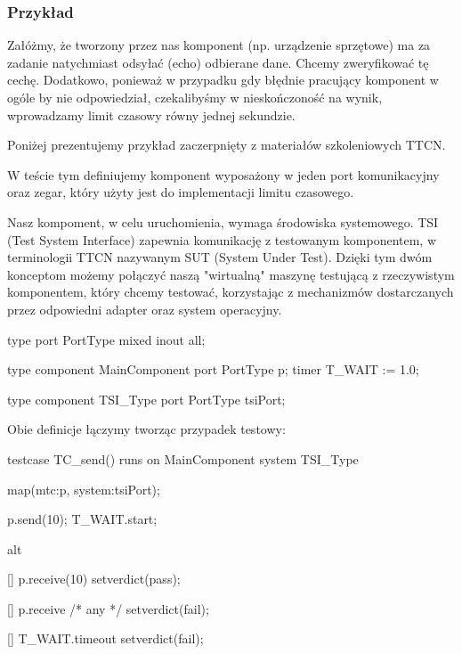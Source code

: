 \documentclass[00-praca-magisterska.tex]{subfiles}
\begin{document}
\subsubsection{Przykład}

Załóżmy, że tworzony przez nas komponent (np. urządzenie sprzętowe) ma za
zadanie natychmiast odsyłać (echo) odbierane dane. Chcemy zweryfikować tę
cechę. Dodatkowo, ponieważ w przypadku gdy błędnie pracujący komponent w ogóle
by nie odpowiedział, czekalibyśmy w nieskończoność na wynik, wprowadzamy limit
czasowy równy jednej sekundzie.

Poniżej prezentujemy przykład zaczerpnięty z materiałów szkoleniowych
TTCN. 

W teście tym definiujemy komponent  wyposażony w jeden port
komunikacyjny oraz zegar, który użyty jest do implementacji limitu czasowego.

Nasz kompoment, w celu uruchomienia, wymaga środowiska systemowego. TSI (Test
System Interface) zapewnia komunikację z testowanym komponentem, w terminologii
TTCN nazywanym SUT (System Under Test). Dzięki tym dwóm konceptom możemy
połączyć naszą "wirtualną" maszynę testującą z rzeczywistym komponentem, który
chcemy testować, korzystając z mechanizmów dostarczanych przez odpowiedni
adapter oraz system operacyjny.

\begin{textcode}
  type port PortType mixed { inout all; }
  
  type component MainComponent
  {
      port PortType p;
      timer T_WAIT := 1.0;
  }
  
  type component TSI_Type
  {
      port PortType tsiPort;
  }
\end{textcode}

Obie definicje łączymy tworząc przypadek testowy:

\begin{textcode}
  testcase TC_send() runs on MainComponent system TSI_Type
  {
      map(mtc:p, system:tsiPort);
  
      p.send(10);
      T_WAIT.start;
  
      alt
      {
          [] p.receive(10)
          {
              setverdict(pass);
          }
  
          [] p.receive /* any */
          {
              setverdict(fail);
          }
  
          [] T_WAIT.timeout
          {
              setverdict(fail);
          }
      }
  }
\end{textcode}
\end{document}
